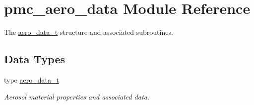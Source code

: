 \hypertarget{namespacepmc__aero__data}{}\section{pmc\+\_\+aero\+\_\+data Module Reference}
\label{namespacepmc__aero__data}


The \mbox{\hyperlink{structpmc__aero__data_1_1aero__data__t}{aero\+\_\+data\+\_\+t}} structure and associated subroutines.  


\subsection*{Data Types}
\begin{DoxyCompactItemize}
\item 
type \mbox{\hyperlink{structpmc__aero__data_1_1aero__data__t}{aero\+\_\+data\+\_\+t}}
\begin{DoxyCompactList}\small\item\em Aerosol material properties and associated data. \end{DoxyCompactList}\end{DoxyCompactItemize}
